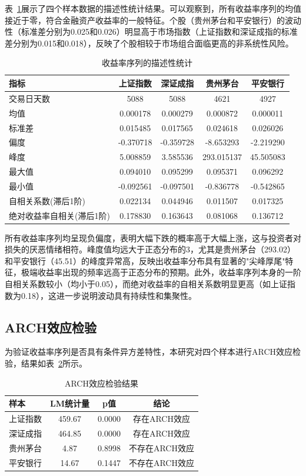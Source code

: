 \documentclass[12pt, a4paper]{article}
\begin{document}
表~\ref{tab:descriptive_stats}展示了四个样本数据的描述性统计结果。可以观察到，所有收益率序列的均值接近于零，符合金融资产收益率的一般特征。个股（贵州茅台和平安银行）的波动性（标准差分别为0.025和0.026）明显高于市场指数（上证指数和深证成指的标准差分别为0.015和0.018），反映了个股相较于市场组合面临更高的非系统性风险。

\begin{table}[htbp]
\centering
\caption{收益率序列的描述性统计}
\label{tab:descriptive_stats}
\begin{tabular}{lcccc}
\toprule
指标 & 上证指数 & 深证成指 & 贵州茅台 & 平安银行 \\
\midrule
交易日天数 & 5088 & 5088 & 4621 & 4927 \\
均值 & 0.000178 & 0.000279 & 0.000872 & 0.000011 \\
标准差 & 0.015485 & 0.017565 & 0.024618 & 0.026026 \\
偏度 & -0.370718 & -0.359728 & -8.653293 & -2.219290 \\
峰度 & 5.008859 & 3.585536 & 293.015137 & 45.505083 \\
最大值 & 0.094010 & 0.095299 & 0.095371 & 0.096292 \\
最小值 & -0.092561 & -0.097501 & -0.836778 & -0.542865 \\
自相关系数(滞后1阶) & 0.022134 & 0.044946 & 0.011507 & 0.017325 \\
绝对收益率自相关(滞后1阶) & 0.178830 & 0.163643 & 0.081068 & 0.136712 \\
\bottomrule
\end{tabular}
\end{table}

所有收益率序列均呈现负偏度，表明大幅下跌的概率高于大幅上涨，这与投资者对损失的厌恶情绪相符。峰度值均远大于正态分布的3，尤其是贵州茅台（293.02）和平安银行（45.51）的峰度异常高，反映出收益率分布具有显著的"尖峰厚尾"特征，极端收益率出现的频率远高于正态分布的预期。此外，收益率序列本身的一阶自相关系数较小（均小于0.05），而绝对收益率的自相关系数明显更高（如上证指数为0.18），这进一步说明波动具有持续性和集聚性。

\subsection{ARCH效应检验}

为验证收益率序列是否具有条件异方差特性，本研究对四个样本进行ARCH效应检验，结果如表~\ref{tab:arch_test}所示。

\begin{table}[htbp]
\centering
\caption{ARCH效应检验结果}
\label{tab:arch_test}
\begin{tabular}{lccc}
\toprule
样本 & LM统计量 & p值 & 结论 \\
\midrule
上证指数 & 459.67 & 0.0000 & 存在ARCH效应 \\
深证成指 & 464.85 & 0.0000 & 存在ARCH效应 \\
贵州茅台 & 4.87 & 0.8998 & 不存在ARCH效应 \\
平安银行 & 14.67 & 0.1447 & 不存在ARCH效应 \\
\bottomrule
\end{tabular}
\end{table}
\end{document}
